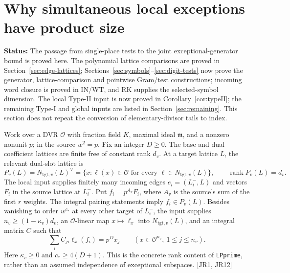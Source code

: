 \documentclass[11pt,a4paper]{article}
\numberwithin{equation}{section}
\theoremstyle{remark}\newtheorem{remark}[theorem]{Remark}
\newcommand{\status}[1]{\textbf{Status:} #1}
\begin{document}
\section{Why simultaneous local exceptions have product size}\label{sec:joint-rank}

\status{The passage from single-place tests to the joint exceptional-generator bound is proved here. The polynomial lattice comparisons are proved in Section~\ref{sec:edge-lattices}; Sections~\ref{sec:symbols}--\ref{sec:digit-tests} now prove the generator, lattice-comparison and pointwise Gram/test constructions; incoming word closure is proved in IN/WT, and RK supplies the selected-symbol dimension. The local Type-II input is now proved in Corollary~\ref{cor:typeII}; the remaining Type-I and global inputs are listed in Section~\ref{sec:remaining}. This section does not repeat the conversion of elementary-divisor tails to index.}

Work over a DVR $\mathcal O$ with fraction field $K$, maximal ideal $\mathfrak m$, and a nonzero nonunit $p$; in the source $w^2=p$. Fix an integer $D\ge0$. The base and dual coefficient lattices are finite free of constant rank $d_v$. At a target lattice $L$, the relevant dual-slot lattice is
\[
 P_v(L)=N_{\mathrm{tgt},v}(L)^\vee
   =\{x:\ell(x)\in\mathcal O\text{ for every }\ell\in N_{\mathrm{tgt},v}(L)\},
 \qquad \operatorname{rank}P_v(L)=d_v.
\]
The local input supplies finitely many incoming edges $e_i=(L_i^-,L)$ and vectors $F_i$ in the source lattice at $L_i^-$. Put $f_i=p^{A_v}F_i$, where $A_v$ is the source's sum of the first $r$ weights. The integral pairing statements imply $f_i\in P_v(L)$. Besides vanishing to order $w^{c_*}$ at every other target of $L_i^-$, the input supplies $n_v\ge(1-\kappa_v)d_v$, an $\mathcal O$-linear map $x\mapsto\ell_x$ into $N_{\mathrm{tgt},v}(L)$, and an integral matrix $C$ such that
\begin{equation}\label{eq:jr-tests}
 \sum_i C_{ji}\ell_x(f_i)=p^D x_j
 \qquad(x\in\mathcal O^{n_v},\ 1\le j\le n_v).
\end{equation}
Here $\kappa_v\ge0$ and $c_*\ge4(D+1)$. This is the concrete rank content of \texttt{LPprime}, rather than an assumed independence of exceptional subspaces. \textsf{[JR1, JR12]}
\end{document}
